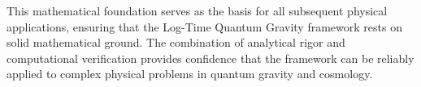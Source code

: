 This mathematical foundation serves as the basis for all subsequent physical applications, ensuring that the Log-Time Quantum Gravity framework rests on solid mathematical ground. The combination of analytical rigor and computational verification provides confidence that the framework can be reliably applied to complex physical problems in quantum gravity and cosmology.